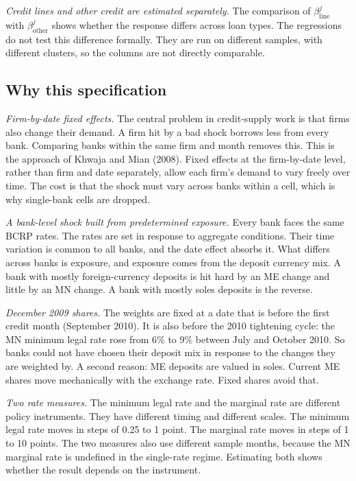 \documentclass[11pt]{article}
\renewcommand{\_}{\origunderscore\hspace{0pt}}  %
\begin{document}
\textit{Credit lines and other credit are estimated separately.}
The comparison of $\beta^{j}_{\text{line}}$ with $\beta^{j}_{\text{other}}$ shows whether the response differs across loan types.
The regressions do not test this difference formally.
They are run on different samples, with different clusters, so the columns are not directly comparable.

\subsection{Why this specification}

\textit{Firm-by-date fixed effects.}
The central problem in credit-supply work is that firms also change their demand.
A firm hit by a bad shock borrows less from every bank.
Comparing banks within the same firm and month removes this.
This is the approach of Khwaja and Mian (2008).
Fixed effects at the firm-by-date level, rather than firm and date separately, allow each firm's demand to vary freely over time.
The cost is that the shock must vary across banks within a cell, which is why single-bank cells are dropped.

\textit{A bank-level shock built from predetermined exposure.}
Every bank faces the same BCRP rates.
The rates are set in response to aggregate conditions.
Their time variation is common to all banks, and the date effect absorbs it.
What differs across banks is exposure, and exposure comes from the deposit currency mix.
A bank with mostly foreign-currency deposits is hit hard by an ME change and little by an MN change.
A bank with mostly soles deposits is the reverse.

\textit{December 2009 shares.}
The weights are fixed at a date that is before the first credit month (September 2010).
It is also before the 2010 tightening cycle: the MN minimum legal rate rose from 6\% to 9\% between July and October 2010.
So banks could not have chosen their deposit mix in response to the changes they are weighted by.
A second reason: ME deposits are valued in soles.
Current ME shares move mechanically with the exchange rate.
Fixed shares avoid that.

\textit{Two rate measures.}
The minimum legal rate and the marginal rate are different policy instruments.
They have different timing and different scales.
The minimum legal rate moves in steps of 0.25 to 1 point.
The marginal rate moves in steps of 1 to 10 points.
The two measures also use different sample months, because the MN marginal rate is undefined in the single-rate regime.
Estimating both shows whether the result depends on the instrument.
\end{document}
